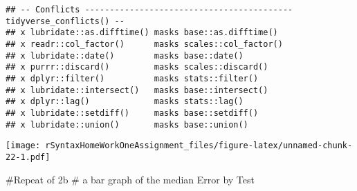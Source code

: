 \documentclass[
]{article}
\newenvironment{Shaded}{\begin{snugshade}}{\end{snugshade}}
\newcommand{\DataTypeTok}[1]{\textcolor[rgb]{0.13,0.29,0.53}{#1}}
\newcommand{\DecValTok}[1]{\textcolor[rgb]{0.00,0.00,0.81}{#1}}
\newcommand{\KeywordTok}[1]{\textcolor[rgb]{0.13,0.29,0.53}{\textbf{#1}}}
\newcommand{\NormalTok}[1]{#1}
\newcommand{\OperatorTok}[1]{\textcolor[rgb]{0.81,0.36,0.00}{\textbf{#1}}}
\newcommand{\StringTok}[1]{\textcolor[rgb]{0.31,0.60,0.02}{#1}}
\begin{document}
\begin{verbatim}
## -- Conflicts ------------------------------------------ tidyverse_conflicts() --
## x lubridate::as.difftime() masks base::as.difftime()
## x readr::col_factor()      masks scales::col_factor()
## x lubridate::date()        masks base::date()
## x purrr::discard()         masks scales::discard()
## x dplyr::filter()          masks stats::filter()
## x lubridate::intersect()   masks base::intersect()
## x dplyr::lag()             masks stats::lag()
## x lubridate::setdiff()     masks base::setdiff()
## x lubridate::union()       masks base::union()
\end{verbatim}

\begin{Shaded}
\end{Shaded}

\texttt{[image: rSyntaxHomeWorkOneAssignment\_files/figure-latex/unnamed-chunk-22-1.pdf]}

\#Repeat of 2b \# a bar graph of the median Error by Test
\end{document}
